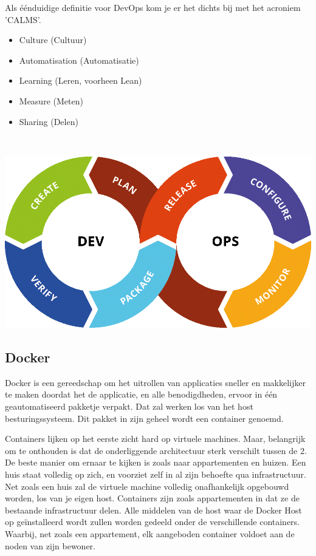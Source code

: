 Als éénduidige definitie voor DevOps kom je er het dichts bij met het acroniem 'CALMS'.
\begin{itemize}[noitemsep]
	\item Culture (Cultuur)
	\item Automatisation (Automatisatie)
	\item Learning (Leren, voorheen Lean)
	\item Measure (Meten)
	\item Sharing (Delen)
\end{itemize}

 ~\autocite{WhatIsDevOps}

\begin{center}
\includegraphics[scale=0.5]{img/devops.png}
\end{center}

\subsection{Docker}
\label{sec:docker-uitleg}
Docker is een gereedschap om het uitrollen van applicaties sneller en makkelijker te maken doordat het de applicatie, en alle benodigdheden, ervoor in één geautomatiseerd pakketje verpakt. Dat zal werken los van het host besturingssysteem. Dit pakket in zijn geheel wordt een container genoemd. ~\autocite{OpenSourceDocker}

Containers lijken op het eerste zicht hard op virtuele machines. Maar, belangrijk om te onthouden is dat de onderliggende architectuur sterk verschilt tussen de 2. De beste manier om ernaar te kijken is zoals naar appartementen en huizen. Een huis staat volledig op zich, en voorziet zelf in al zijn behoefte qua infrastructuur. Net zoals een huis zal de virtuele machine volledig onafhankelijk opgebouwd worden, los van je eigen host. Containers zijn zoals appartementen in dat ze de bestaande infrastructuur delen. Alle middelen van de host waar de Docker Host op geïnstalleerd wordt zullen worden gedeeld onder de verschillende containers. Waarbij, net zoals een appartement, elk aangeboden container voldoet aan de noden van zijn bewoner. ~\autocite{ContainerVsVM}

